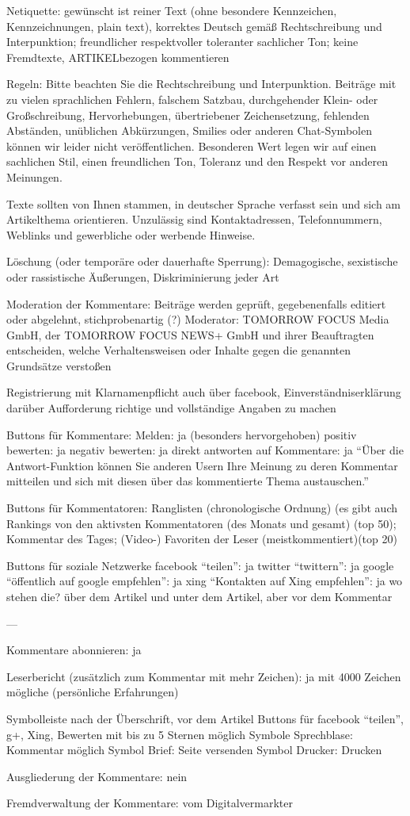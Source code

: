 	
Netiquette: 
	gewünscht ist reiner Text (ohne besondere Kennzeichen, Kennzeichnungen, plain text), korrektes Deutsch gemäß Rechtschreibung und Interpunktion; freundlicher respektvoller toleranter sachlicher Ton; keine Fremdtexte, ARTIKELbezogen kommentieren
	
	
	Regeln: 
	Bitte beachten Sie die Rechtschreibung und Interpunktion. Beiträge mit zu vielen sprachlichen Fehlern, falschem Satzbau, durchgehender Klein- oder Großschreibung, Hervorhebungen, übertriebener Zeichensetzung, fehlenden Abständen, unüblichen Abkürzungen, Smilies oder anderen Chat-Symbolen können wir leider nicht veröffentlichen.
Besonderen Wert legen wir auf einen sachlichen Stil, einen freundlichen Ton, Toleranz und den Respekt vor anderen Meinungen.


Texte sollten von Ihnen stammen, in deutscher Sprache verfasst sein und sich am Artikelthema orientieren.
Unzulässig sind Kontaktadressen, Telefonnummern, Weblinks und gewerbliche oder werbende Hinweise.

	Löschung (oder temporäre oder dauerhafte Sperrung): Demagogische, sexistische oder rassistische Äußerungen, Diskriminierung jeder Art
	

Moderation der Kommentare: Beiträge werden geprüft, gegebenenfalls editiert oder abgelehnt, stichprobenartig (?)
Moderator: TOMORROW FOCUS Media GmbH, der TOMORROW FOCUS NEWS+ GmbH und ihrer Beauftragten entscheiden, welche Verhaltensweisen oder Inhalte gegen die genannten Grundsätze verstoßen


Registrierung 
	mit Klarnamenpflicht 
	auch über facebook, Einverständniserklärung darüber
	Aufforderung richtige und vollständige Angaben zu machen
	
	
	
Buttons für Kommentare: 
	Melden: ja (besonders hervorgehoben)
	positiv bewerten: ja
	negativ bewerten: ja
	direkt antworten auf Kommentare: ja ``Über die Antwort-Funktion können Sie anderen Usern Ihre Meinung zu deren Kommentar mitteilen und sich mit diesen über das kommentierte Thema austauschen.''


Buttons für Kommentatoren: 
	Ranglisten (chronologische Ordnung) (es gibt auch Rankings von den aktivsten Kommentatoren (des Monats und gesamt) (top 50); 
	Kommentar des Tages; 
	(Video-) Favoriten der Leser (meistkommentiert)(top 20)

Buttons für soziale Netzwerke 
	facebook ``teilen'': ja
	twitter ``twittern'': ja
	google ``öffentlich auf google empfehlen'': ja
	xing ``Kontakten auf Xing empfehlen'': ja
	wo stehen die? über dem Artikel und unter dem Artikel, aber vor dem Kommentar


---

Kommentare abonnieren: ja

Leserbericht (zusätzlich zum Kommentar mit mehr Zeichen): ja mit 4000 Zeichen mögliche (persönliche Erfahrungen)


Symbolleiste nach der Überschrift, vor dem Artikel
	Buttons für facebook ``teilen'', g+, Xing, Bewerten mit bis zu 5 Sternen möglich
	Symbole Sprechblase: Kommentar möglich
	Symbol Brief: Seite versenden
	Symbol Drucker: Drucken

Ausgliederung der Kommentare: nein

Fremdverwaltung der Kommentare: vom Digitalvermarkter